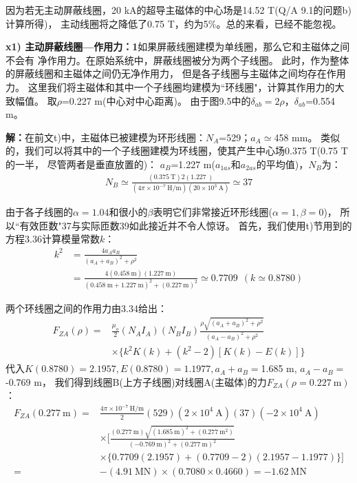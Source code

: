 因为若无主动屏蔽线圈，20 kA的超导主磁体的中心场是14.52 T(Q/A 9.1的问题b)计算所得)，
主动线圈将之降低了0.75 T，约为5\%。总的来看，已经不能忽视。

\textbf{x1) 主动屏蔽线圈---作用力：1}\qquad 如果屏蔽线圈建模为单线圈，那么它和主磁体之间不会有
净作用力。在原始系统中，屏蔽线圈被分为两个子线圈。
此时，作为整体的屏蔽线圈和主磁体之间仍无净作用力，
但是各子线圈与主磁体之间均存在作用力。
这里我们将主磁体和其中一个子线圈均建模为``环线圈"，计算其作用力的大致幅值。
取$\rho$=0.227 m(中心对中心距离)。
由于图9.5中的$\delta_{ab}=2\rho$，$\delta_{ab}$=0.554 m。

\textbf{解：}在前文t)中，主磁体已被建模为环形线圈：$N_A$=529；$a_A\simeq$458 mm。
类似的，我们可以将其中的一个子线圈建模为环线圈，使其产生中心场0.375 T(0.75 T的一半，
尽管两者是垂直放置的)：
$a_B$=1.227 m($a_{1as}$和$a_{2as}$的平均值)，$N_B$为：
\begin{align*}%
N_B\simeq\frac{(0.375\ \mathrm{T})2(1.227\ \mathrm{})}{(4\pi\times 10^{-7}\ \mathrm{H/m})(20\times 10^3\ \mathrm{A})}\simeq 37
\end{align*}

由于各子线圈的$\alpha=1.04$和很小的$\beta$表明它们非常接近环形线圈($\alpha=1,\beta=0$)，
所以``有效匝数"37与实际匝数39如此接近并不令人惊讶。
首先，我们使用t)节用到的方程3.36计算模量常数$k$：
\begin{align*}%
k^2&=\frac{4a_Aa_B}{(a_A+a_B)^2+\rho^2}\\ \tag{3.36}
&=\frac{4(0.458\ \mathrm{m})(1.227\ \mathrm{m})}{(0.458\ \mathrm{m+1.227\ \mathrm{m}})^2+(0.227\ \mathrm{m})^2}\simeq 0.7709\   \ (k\simeq 0.8780)
\end{align*}

两个环线圈之间的作用力由3.34给出：
\begin{align*}%
F_{ZA}(\rho)=&\frac{\mu_o}{2}(N_AI_A)(N_BI_B)\frac{\rho\sqrt{(a_A+a_B)^2+\rho^2}}{(a_A-a_B)^2+\rho^2}\\
&\times\{k^2K(k)+(k^2-2)[K(k)-E(k)]\} \tag{3.34}
\end{align*}
代入$K(0.8780)=2.1957,E(0.8780)=1.1977,a_A+a_B=$1.685 m, $a_A-a_B=$-0.769 m，
我们得到线圈B(上方子线圈)对线圈A(主磁体)的力$F_{ZA}(\rho=0.227\ \mathrm{m})$：
\begin{align*}%
F_{ZA}(0.277\ \mathrm{m})=&\frac{4\pi\times 10^{-7}\ \mathrm{H/m}}{2}(529)(2\times 10^4\  \mathrm{A})(37)(-2\times 10^{4}\ \mathrm{A})\\
&\times \big[\frac{(0.277\ \mathrm{m})\sqrt{(1.685\ \mathrm{m})^2+(0.277\ \mathrm{m}^2)}}{(-0.769\ \mathrm{m})^2+(0.277\ \mathrm{m})^2}\\
&\times\{0.7709(2.1957)+(0.7709-2)(2.1957-1.1977)\}\big]\\
=&-(4.91\ \mathrm{MN})\times(0.7080\times 0.4660)=-1.62\ \mathrm{MN}
\end{align*}

